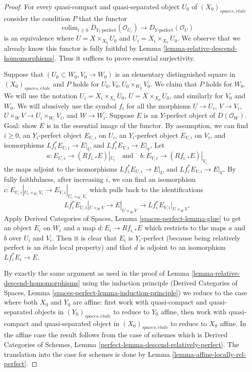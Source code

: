 \documentclass[10pt,a4paper]{amsart}
\theoremstyle{plain}
\theoremstyle{definition}
\theoremstyle{remark}
\numberwithin{equation}{subsection}
\def\colim{\mathop{\mathrm{colim}}\nolimits}
\def\etale{{\acute{e}tale}}
\begin{document}
\begin{proof}
For every quasi-compact and quasi-separated object $U_0$ of
$(X_0)_{spaces, \etale}$ consider the condition $P$
that the functor
$$
\colim_{i \geq 0} D_{Y_i\text{-perfect}}(\mathcal{O}_{U_i})
\longrightarrow
D_{Y\text{-perfect}}(\mathcal{O}_U)
$$
is an equivalence where $U = X \times_{X_0} U_0$ and
$U_i = X_i \times_{X_0} U_0$.
We observe that we already know this functor is fully faithful
by Lemma \ref{lemma-relative-descend-homomorphisms}. Thus it suffices to prove
essential surjectivity.

\medskip\noindent
Suppose that $(U_0 \subset W_0, V_0 \to W_0)$ is an elementary
distinguished square in $(X_0)_{spaces, \etale}$
and $P$ holds for $U_0, V_0, U_0 \times_{W_0} V_0$.
We claim that $P$ holds for $W_0$. We will use the notation
$U_i = X_i \times_{X_0} U_0$, $U = X \times_{X_0} U_0$,
and similarly for $V_0$ and $W_0$. We will abusively use the symbol
$f_i$ for all the morphisms $U \to U_i$, $V \to V_i$,
$U \times_W V \to U_i \times_{W_i} V_i$, and $W \to W_i$.
Suppose $E$ is an $Y$-perfect object of $D(\mathcal{O}_W)$.
Goal: show $E$ is in the essential image of the functor.
By assumption,
we can find $i \geq 0$, an $Y_i$-perfect object $E_{U, i}$ on $U_i$,
an $Y_i$-perfect object $E_{V, i}$ on $V_i$, and
isomorphisms $Lf_i^*E_{U, i} \to E|_U$ and $Lf_i^*E_{V, i} \to E|_V$.
Let
$$
a : E_{U, i} \to (Rf_{i, *}E)|_{U_i}
\quad\text{and}\quad
b : E_{V, i} \to (Rf_{i, *}E)|_{V_i}
$$
the maps adjoint to the isomorphisms $Lf_i^*E_{U, i} \to E|_U$
and $Lf_i^*E_{V, i} \to E|_V$.
By fully faithfulness, after increasing $i$,
we can find an isomorphism
$c : E_{U, i}|_{U_i \times_{W_i} V_i} \to E_{V, i}|_{U_i \times_{W_i} V_i}$
which pulls back to the identifications 
$$
Lf_i^*E_{U, i}|_{U \times_W V} \to E|_{U \times_W V} \to
Lf_i^*E_{V, i}|_{U \times_W V}.
$$
Apply Derived Categories of Spaces, Lemma
\ref{spaces-perfect-lemma-glue}
to get an object $E_i$ on $W_i$ and a map $d : E_i \to Rf_{i, *}E$
which restricts to the maps $a$ and $b$ over $U_i$ and $V_i$.
Then it is clear that $E_i$ is $Y_i$-perfect (because being
relatively perfect is an \'etale local property) and that
$d$ is adjoint to an isomorphism $Lf_i^*E_i \to E$.

\medskip\noindent
By exactly the same argument as used in
the proof of Lemma \ref{lemma-relative-descend-homomorphisms}
using the induction principle
(Derived Categories of Spaces, Lemma
\ref{spaces-perfect-lemma-induction-principle})
we reduce to the case where both $X_0$ and $Y_0$
are affine: first work with quasi-compact and quasi-separated objects
in $(Y_0)_{spaces, \etale}$ to reduce to
$Y_0$ affine, then work with quasi-compact and quasi-separated object
in $(X_0)_{spaces, \etale}$ to reduce to $X_0$ affine.
In the affine case the result follows from the case of schemes which is
Derived Categories of Schemes, Lemma
\ref{perfect-lemma-descend-relatively-perfect}.
The translation into the case for schemes is done by
Lemma \ref{lemma-affine-locally-rel-perfect}.
\end{proof}
\end{document}
